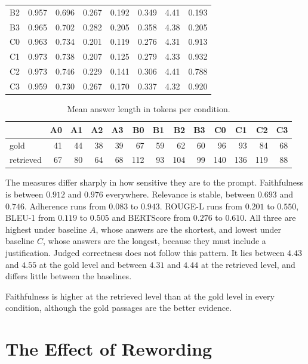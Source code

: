\documentclass[12pt,a4paper,oneside]{scrreprt}
\begin{document}
\begin{table}[htbp]
\begin{tabular}{lrrrrrrr}
B2 & 0.957 & 0.696 & 0.267 & 0.192 & 0.349 & 4.41 & 0.193 \\
B3 & 0.965 & 0.702 & 0.282 & 0.205 & 0.358 & 4.38 & 0.205 \\
C0 & 0.963 & 0.734 & 0.201 & 0.119 & 0.276 & 4.31 & 0.913 \\
C1 & 0.973 & 0.738 & 0.207 & 0.125 & 0.279 & 4.33 & 0.932 \\
C2 & 0.973 & 0.746 & 0.229 & 0.141 & 0.306 & 4.41 & 0.788 \\
C3 & 0.959 & 0.730 & 0.267 & 0.170 & 0.337 & 4.32 & 0.920 \\
\bottomrule
\end{tabular}
\end{table}

\begin{table}[htbp]
\centering
\caption{Mean answer length in tokens per condition.}
\label{tab:length}
\setlength{\tabcolsep}{3.5pt}
\begin{tabular}{lrrrrrrrrrrrr}
\toprule
 & A0 & A1 & A2 & A3 & B0 & B1 & B2 & B3 & C0 & C1 & C2 & C3 \\
\midrule
gold & 41 & 44 & 38 & 39 & 67 & 59 & 62 & 60 & 96 & 93 & 84 & 68 \\
retrieved & 67 & 80 & 64 & 68 & 112 & 93 & 104 & 99 & 140 & 136 & 119 & 88 \\
\bottomrule
\end{tabular}
\end{table}

The measures differ sharply in how sensitive they are to the prompt. Faithfulness is between $0.912$ and $0.976$ everywhere. Relevance is stable, between $0.693$ and $0.746$. Adherence runs from $0.083$ to $0.943$. ROUGE-L runs from $0.201$ to $0.550$, BLEU-1 from $0.119$ to $0.505$ and BERTScore from $0.276$ to $0.610$. All three are highest under baseline $A$, whose answers are the shortest, and lowest under baseline $C$, whose answers are the longest, because they must include a justification. Judged correctness does not follow this pattern. It lies between $4.43$ and $4.55$ at the gold level and between $4.31$ and $4.44$ at the retrieved level, and differs little between the baselines.

Faithfulness is higher at the retrieved level than at the gold level in every condition, although the gold passages are the better evidence. 

\section{The Effect of Rewording}
\label{sec:effects}
\end{document}
